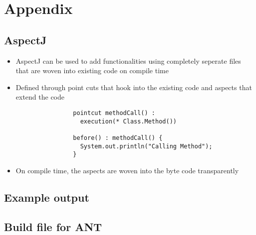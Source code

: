 \section{Appendix}
\subsection{AspectJ} \label{sec:aspectj}
	\begin{itemize}
		\item AspectJ can be used to add functionalities using completely
			seperate files that are woven into existing code on compile time
		\item Defined through point cuts that hook into the existing code and aspects that
			extend the code
	
			\begin{verbatim}
				pointcut methodCall() :
				  execution(* Class.Method())
				  
				before() : methodCall() {
				  System.out.println("Calling Method");
				}
			\end{verbatim}
		
		\item On compile time, the aspects are woven into the byte code transparently
		
	\end{itemize}
	
\subsection{Example output} \label{sec:exampleOutput}
	
	
\subsection{Build file for ANT} \label{sec:antBuildFile}
	